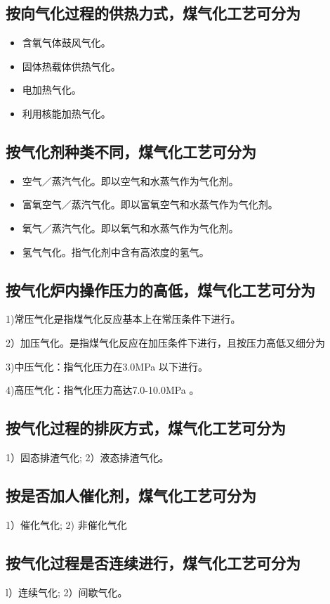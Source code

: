 \documentclass[10pt,openany]{ctexbook}
\begin{document}
\subsection{按向气化过程的供热力式，煤气化工艺可分为}
\begin{itemize}
\item 含氧气体鼓风气化。
\item 固体热载体供热气化。
\item 电加热气化。
\item 利用核能加热气化。


\end{itemize}
\subsection{按气化剂种类不同，煤气化工艺可分为}
\begin{itemize}
\item  空气／蒸汽气化。即以空气和水蒸气作为气化剂。
\item 富氧空气／蒸汽气化。即以富氧空气和水蒸气作为气化剂。
\item 氧气／蒸汽气化。即以氧气和水蒸气作为气化剂。
\item 氢气气化。指气化剂中含有高浓度的氢气。

\end{itemize}
\subsection{按气化炉内操作压力的高低，煤气化工艺可分为}
1)常压气化是指煤气化反应基本上在常压条件下进行。\par
2）加压气化。是指煤气化反应在加压条件下进行，且按压力高低又细分为\par
3)中压气化：指气化压力在3.0MPa 以下进行。 \par
4)高压气化：指气化压力高达7.0-10.0MPa 。\par
\subsection{按气化过程的排灰方式，煤气化工艺可分为}
1）固态排渣气化;
2）液态排渣气化。
\subsection{按是否加人催化剂，煤气化工艺可分为}
1）催化气化;
2) 非催化气化
\subsection{按气化过程是否连续进行，煤气化工艺可分为}
l）连续气化;
2）间歇气化。
\end{document}
